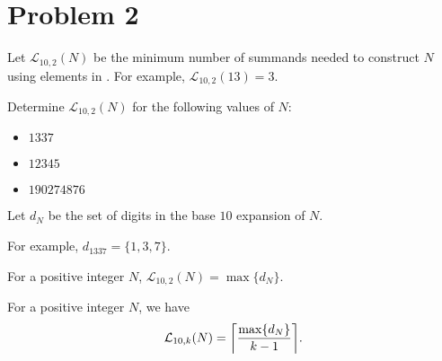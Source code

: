 \documentclass{article}
\begin{document}
\section{Problem 2}
\begin{definition}
  Let $\mathcal{L}_{10, 2}(N)$ be the minimum number of summands needed to construct $N$ using elements in \NTen. For example, $\mathcal{L}_{10, 2}(13) = 3$.
\end{definition}
\begin{problem}
Determine $\mathcal{L}_{10, 2}(N)$ for the following values of $N$:
\begin{itemize}
  \item $1337$
  \item  $12345$
  \item  $190274876$
\end{itemize}
\end{problem}
\begin{definition}
Let $d_N$ be the set of digits in the base $10$ expansion of $N$.
\end{definition}
For example, $d_{1337} = \{1, 3, 7\}$.
\begin{theorem}
  For a positive integer $N$, $\mathcal{L}_{10, 2}(N) = \max\{d_N\}$.
\end{theorem}
\begin{theorem}
  For a positive integer $N$, we have \[\mathcal{L}_{10, k}(N) = \ceil*{\frac{\max\{d_N\}}{k-1}}.\]
\end{theorem}
\end{document}
